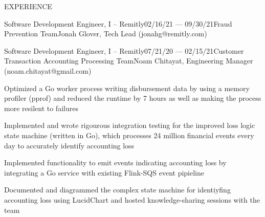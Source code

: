 \documentclass{resume} %
\begin{document}
\begin{rSection}{EXPERIENCE}
\begin{rSubsection}{Software Development Engineer, I -- Remitly}{02/16/21 --- 09/30/21}{Fraud Prevention Team}{Jonah Glover, Tech Lead (jonahg@remitly.com)}
\end{rSubsection}

\begin{rSubsection}{Software Development Engineer, I -- Remitly}{07/21/20 --- 02/15/21}{Customer Transaction Accounting Processing Team}{Noam Chitayat, Engineering Manager (noam.chitayat@gmail.com)}
    
    \item Optimized a Go worker process writing disbursement data by using a memory profiler (pprof) and reduced the runtime by 7 hours as well as making the process more resilent to failures
    \item Implemented and wrote rigourous integration testing for the improved loss logic state machine (written in Go), which processes 24 million financial events every day to accurately identify accounting loss
    \item Implemented functionality to emit events indicating accounting loss by integrating a Go service with existing Flink-SQS event pipieline
    \item Documented and diagrammed the complex state machine for identiyfing accounting loss using LucidChart and hosted knowledge-sharing sessions with the team

\end{rSubsection}




\end{rSection}
\end{document}
